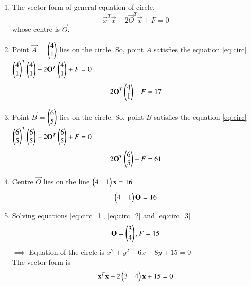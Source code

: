 \renewcommand{\theequation}{\theenumi}
\begin{enumerate}[label=\arabic*.,ref=\thesubsection.\theenumi]
\item The vector form of general equation of circle, 
\begin{equation} \label{eq:circ}
\vec{x}^T\vec{x}-2\vec{O}^T\vec{x}+F=0
\end{equation}
whose centre is $\vec{O}$.

\item Point $\vec{A}$ = $\begin{pmatrix}4\\1\end{pmatrix}$ lies on the circle. So, point $A$ satisfies the equation \ref{eq:circ} \\
$\begin{pmatrix}4\\1\end{pmatrix}^T\begin{pmatrix}4\\1\end{pmatrix}-2\mathbf{O}^T\begin{pmatrix}4\\1\end{pmatrix}+F=0$ \\
\begin{equation} \label{eq:circ_1}
2\mathbf{O}^T\begin{pmatrix}4\\1\end{pmatrix} - F = 17
\end{equation}

\item Point $\vec{B}$ = $\begin{pmatrix}6\\5\end{pmatrix}$ lies on the circle. So, point $B$ satisfies the equation \ref{eq:circ} \\
$\begin{pmatrix}6\\5\end{pmatrix}^T\begin{pmatrix}6\\5\end{pmatrix}-2\mathbf{O}^T\begin{pmatrix}6\\5\end{pmatrix}+F=0$ \\
\begin{equation} \label{eq:circ_2}
2\mathbf{O}^T\begin{pmatrix}6\\5\end{pmatrix} - F = 61
\end{equation}

\item  Centre $\vec{O}$ lies on the line $\begin{pmatrix}4&1\end{pmatrix}\mathbf{x}=16$ \\
\begin{equation} \label{eq:circ_3}
\begin{pmatrix}4&1\end{pmatrix}\mathbf{O}=16
\end{equation}

\item Solving equations \ref{eq:circ_1}, \ref{eq:circ_2} and \ref{eq:circ_3} \\
$$ \mathbf{O} = \begin{pmatrix}3\\4\end{pmatrix}, F = 15$$
$\implies$ Equation of the circle is $x^2+y^2-6x-8y+15=0$ \\ 
The vector form is 
$$\mathbf{x}^T\mathbf{x}-2\begin{pmatrix}3&4\end{pmatrix}\mathbf{x}+15=0$$


\end{enumerate}
